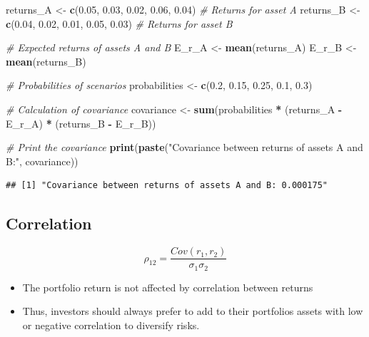 \documentclass[
]{book}
\newenvironment{Shaded}{\begin{snugshade}}{\end{snugshade}}
\newcommand{\CommentTok}[1]{\textcolor[rgb]{0.56,0.35,0.01}{\textit{#1}}}
\newcommand{\FloatTok}[1]{\textcolor[rgb]{0.00,0.00,0.81}{#1}}
\newcommand{\FunctionTok}[1]{\textcolor[rgb]{0.13,0.29,0.53}{\textbf{#1}}}
\newcommand{\NormalTok}[1]{#1}
\newcommand{\OtherTok}[1]{\textcolor[rgb]{0.56,0.35,0.01}{#1}}
\newcommand{\SpecialCharTok}[1]{\textcolor[rgb]{0.81,0.36,0.00}{\textbf{#1}}}
\newcommand{\StringTok}[1]{\textcolor[rgb]{0.31,0.60,0.02}{#1}}
\begin{document}
\begin{Shaded}
\begin{Highlighting}[]
\NormalTok{returns\_A }\OtherTok{\textless{}{-}} \FunctionTok{c}\NormalTok{(}\FloatTok{0.05}\NormalTok{, }\FloatTok{0.03}\NormalTok{, }\FloatTok{0.02}\NormalTok{, }\FloatTok{0.06}\NormalTok{, }\FloatTok{0.04}\NormalTok{)  }\CommentTok{\# Returns for asset A}
\NormalTok{returns\_B }\OtherTok{\textless{}{-}} \FunctionTok{c}\NormalTok{(}\FloatTok{0.04}\NormalTok{, }\FloatTok{0.02}\NormalTok{, }\FloatTok{0.01}\NormalTok{, }\FloatTok{0.05}\NormalTok{, }\FloatTok{0.03}\NormalTok{)  }\CommentTok{\# Returns for asset B}

\CommentTok{\# Expected returns of assets A and B}
\NormalTok{E\_r\_A }\OtherTok{\textless{}{-}} \FunctionTok{mean}\NormalTok{(returns\_A)}
\NormalTok{E\_r\_B }\OtherTok{\textless{}{-}} \FunctionTok{mean}\NormalTok{(returns\_B)}

\CommentTok{\# Probabilities of scenarios}
\NormalTok{probabilities }\OtherTok{\textless{}{-}} \FunctionTok{c}\NormalTok{(}\FloatTok{0.2}\NormalTok{, }\FloatTok{0.15}\NormalTok{, }\FloatTok{0.25}\NormalTok{, }\FloatTok{0.1}\NormalTok{, }\FloatTok{0.3}\NormalTok{)}

\CommentTok{\# Calculation of covariance}
\NormalTok{covariance }\OtherTok{\textless{}{-}} \FunctionTok{sum}\NormalTok{(probabilities }\SpecialCharTok{*}\NormalTok{ (returns\_A }\SpecialCharTok{{-}}\NormalTok{ E\_r\_A) }\SpecialCharTok{*}\NormalTok{ (returns\_B }\SpecialCharTok{{-}}\NormalTok{ E\_r\_B))}

\CommentTok{\# Print the covariance}
\FunctionTok{print}\NormalTok{(}\FunctionTok{paste}\NormalTok{(}\StringTok{"Covariance between returns of assets A and B:"}\NormalTok{, covariance))}
\end{Highlighting}
\end{Shaded}

\begin{verbatim}
## [1] "Covariance between returns of assets A and B: 0.000175"
\end{verbatim}

\hypertarget{correlation}{%
\subsection{Correlation}\label{correlation}}

\[{\rho_12} = \frac{Cov(r_1,r_2 )}{\sigma_1 \sigma_2}\]

\begin{itemize}
\item
  The portfolio return is not affected by correlation between returns
\item
  Thus, investors should always prefer to add to their portfolios assets
  with low or negative correlation to diversify risks.
\end{itemize}
\end{document}
